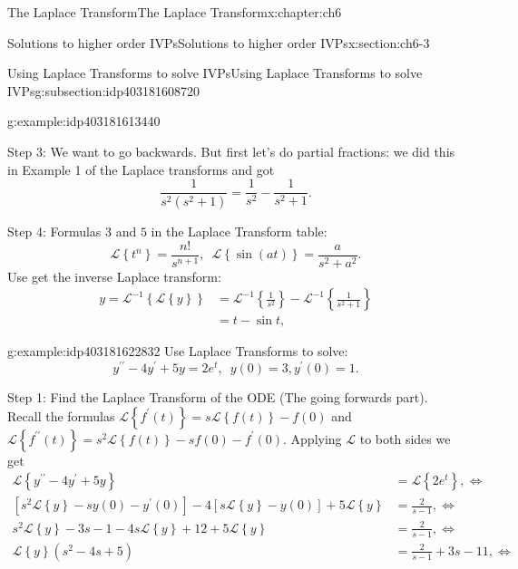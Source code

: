 \documentclass[oneside,10pt,]{book}
\numberwithin{equation}{section}
\numberwithin{equation}{section}
\newcommand{\amp}{&}
\begin{document}
\begin{chapterptx}{The Laplace Transform}{}{The Laplace Transform}{}{}{x:chapter:ch6}
\begin{sectionptx}{Solutions to higher order IVPs}{}{Solutions to higher order IVPs}{}{}{x:section:ch6-3}
\begin{subsectionptx}{Using Laplace Transforms to solve IVPs}{}{Using Laplace Transforms to solve IVPs}{}{}{g:subsection:idp403181608720}
\begin{example}{}{g:example:idp403181613440}
%
\par
Step 3: We want to go backwards. But first let's do partial fractions: we did this in Example 1 of the Laplace transforms and got%
\begin{equation*}
\frac{1}{s^{2}\left(s^{2}+1\right)}=\frac{1}{s^{2}}-\frac{1}{s^{2}+1}.
\end{equation*}
%
\par
Step 4: Formulas \(3\) and \(5\) in the Laplace Transform table:%
\begin{equation*}
\mathcal{L}\left\{ t^{n}\right\} =\frac{n!}{s^{n+1}},\,\,\,\mathcal{L}\left\{ \sin(at)\right\} =\frac{a}{s^{2}+a^{2}}.
\end{equation*}
Use get the inverse Laplace transform:%
\begin{align*}
y=\mathcal{L}^{-1}\left\{ \mathcal{L}\left\{ y\right\} \right\}  \amp =\mathcal{L}^{-1}\left\{ \frac{1}{s^{2}}\right\} -\mathcal{L}^{-1}\left\{ \frac{1}{s^{2}+1}\right\} \\
\amp =t-\sin t,
\end{align*}
%
\end{example}
\begin{example}{}{g:example:idp403181622832}%
Use Laplace Transforms to solve:%
\begin{equation*}
y^{\prime\prime}-4y^{\prime}+5y=2e^{t},\,\,\,y(0)=3,y^{\prime}(0)=1.
\end{equation*}
%
\par
Step 1: Find the Laplace Transform of the ODE (The going forwards part). Recall the formulas \(\mathcal{L}\left\{ f^{\prime}(t)\right\} =s\mathcal{L}\left\{ f(t)\right\} -f(0)\) and \(\mathcal{L}\left\{ f^{\prime\prime}(t)\right\} =s^{2}\mathcal{L}\left\{ f(t)\right\} -sf(0)-f^{\prime}(0)\). Applying \(\mathcal{L}\) to both sides we get%
\begin{align*}
\mathcal{L}\left\{ y^{\prime\prime}-4y^{\prime}+5y\right\}  \amp =\mathcal{L}\left\{ 2e^{t}\right\} ,\iff\\
\left[s^{2}\mathcal{L}\left\{ y\right\} -sy(0)-y^{\prime}(0)\right]-4\left[s\mathcal{L}\left\{ y\right\} -y(0)\right]+5\mathcal{L}\left\{ y\right\}  \amp =\frac{2}{s-1},\iff\\
s^{2}\mathcal{L}\left\{ y\right\} -3s-1-4s\mathcal{L}\left\{ y\right\} +12+5\mathcal{L}\left\{ y\right\}  \amp =\frac{2}{s-1},\iff\\
\mathcal{L}\left\{ y\right\} \left(s^{2}-4s+5\right) \amp =\frac{2}{s-1}+3s-11,\iff
\end{align*}
%
\par

\end{example}
\end{subsectionptx}
\end{sectionptx}
\end{chapterptx}
\end{document}
